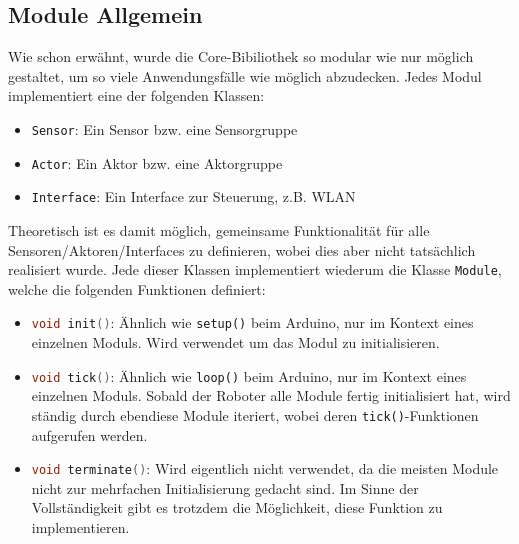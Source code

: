 \subsection{Module Allgemein}
\label{subsec:software_common_modules}
Wie schon erwähnt,
wurde die Core-Bibiliothek so modular wie nur möglich gestaltet,
um so viele Anwendungsfälle wie möglich abzudecken.
%
Jedes Modul implementiert eine der folgenden Klassen:
\begin{itemize}
    \item \texttt{Sensor}: Ein Sensor bzw. eine Sensorgruppe
    \item \texttt{Actor}: Ein Aktor bzw. eine Aktorgruppe
    \item \texttt{Interface}: Ein Interface zur Steuerung, z.B. WLAN
\end{itemize}
Theoretisch ist es damit möglich,
gemeinsame Funktionalität für alle Sensoren/Aktoren/Interfaces zu definieren,
wobei dies aber nicht tatsächlich realisiert wurde.
%
Jede dieser Klassen implementiert wiederum die Klasse \texttt{Module},
welche die folgenden Funktionen definiert:
\begin{itemize}
    \item \lstinline[language=c]|void init()|:
        Ähnlich wie \texttt{setup()} beim Arduino, nur im Kontext eines einzelnen Moduls.
        Wird verwendet um das Modul zu initialisieren.
    \item \lstinline[language=c]|void tick()|:
        Ähnlich wie \texttt{loop()} beim Arduino, nur im Kontext eines einzelnen Moduls.
        Sobald der Roboter alle Module fertig initialisiert hat,
        wird ständig durch ebendiese Module iteriert,
        wobei deren \texttt{tick()}-Funktionen aufgerufen werden. 
    \item \lstinline[language=c]|void terminate()|:
        Wird eigentlich nicht verwendet,
        da die meisten Module nicht zur mehrfachen Initialisierung gedacht sind.
        Im Sinne der Vollständigkeit gibt es trotzdem die Möglichkeit,
        diese Funktion zu implementieren.
\end{itemize}



